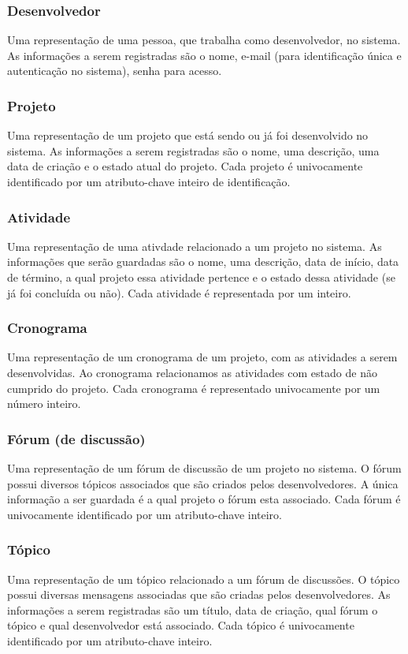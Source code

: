 \documentclass{article}
\begin{document}
		\subsubsection{Desenvolvedor}
		Uma representação de uma pessoa, que trabalha como desenvolvedor, no sistema. As informações a serem registradas são o nome, e-mail (para identificação única e autenticação no sistema), senha para acesso.

		\subsubsection{Projeto}
		Uma representação de um projeto que está sendo ou já foi desenvolvido no sistema. As informações a serem registradas são o nome, uma descrição, uma data de criação e o estado atual do projeto. Cada projeto é univocamente identificado por um atributo-chave inteiro de identificação.

		\subsubsection{Atividade}
		Uma representação de uma ativdade relacionado a um projeto no sistema. As informações que serão guardadas são o nome, uma descrição, data de início, data de término, a qual projeto essa atividade pertence e o estado dessa atividade (se já foi concluída ou não). Cada atividade é representada por um inteiro.

		\subsubsection{Cronograma}
		Uma representação de um cronograma de um projeto, com as atividades a serem desenvolvidas. Ao cronograma relacionamos as atividades com estado de não cumprido do projeto. Cada cronograma é representado univocamente por um número inteiro.

		\subsubsection{Fórum (de discussão)}
		Uma representação de um fórum de discussão de um projeto no sistema. O fórum possui diversos tópicos associados que são criados pelos desenvolvedores. A única informação a ser guardada é a qual projeto o fórum esta associado. Cada fórum é univocamente identificado por um atributo-chave inteiro.

		\subsubsection{Tópico}
		Uma representação de um tópico relacionado a um fórum de discussões. O tópico possui diversas mensagens associadas que são criadas pelos desenvolvedores. As informações a serem registradas são um título, data de criação, qual fórum o tópico e qual desenvolvedor está associado. Cada tópico é univocamente identificado por um atributo-chave inteiro.
\end{document}
